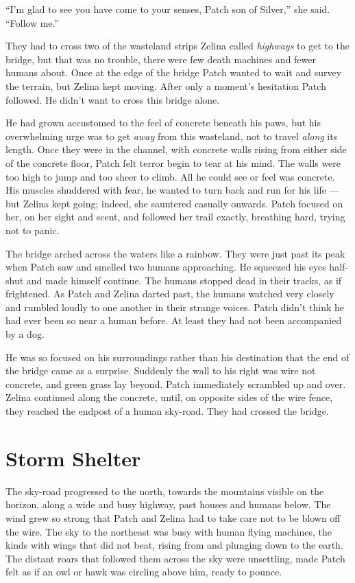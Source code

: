\documentclass[ebook,oneside,openany,17pt]{memoir}
\renewcommand{\thechapter}{\Roman{chapter}}
\newcounter{sections}
\newcommand{\sections}[1]{%
  \section*{#1}
  \addtocounter{sections}{1}%
  \pdfbookmark[1]{#1}{section.\thechapter.\thesections}}
\begin{document}
“I’m glad to see you have come to your senses, Patch son of Silver,”
she said. “Follow me.”

They had to cross two of the wasteland strips Zelina called
\emph{highways} to get to the bridge, but that was no trouble, there
were few death machines and fewer humans about. Once at the edge of
the bridge Patch wanted to wait and survey the terrain, but Zelina
kept moving. After only a moment’s hesitation Patch followed. He
didn’t want to cross this bridge alone.

He had grown accustomed to the feel of concrete beneath his paws, but
his overwhelming urge was to get \emph{away} from this wasteland,
not to travel \emph{along} its length. Once they were in the
channel, with concrete walls rising from either side of the concrete
floor, Patch felt terror begin to tear at his mind. The walls were too
high to jump and too sheer to climb. All he could see or feel was
concrete. His muscles shuddered with fear, he wanted to turn back and
run for his life — but Zelina kept going; indeed, she sauntered
casually onwards. Patch focused on her, on her sight and scent, and
followed her trail exactly, breathing hard, trying not to panic.

The bridge arched across the waters like a rainbow. They were just
past its peak when Patch saw and smelled two humans approaching. He
squeezed his eyes half-shut and made himself continue. The humans
stopped dead in their tracks, as if frightened. As Patch and Zelina
darted past, the humans watched very closely and rumbled loudly to one
another in their strange voices. Patch didn’t think he had ever been
so near a human before. At least they had not been accompanied by a
dog.

He was so focused on his surroundings rather than his destination that
the end of the bridge came as a surprise. Suddenly the wall to his
right was wire not concrete, and green grass lay beyond. Patch
immediately scrambled up and over. Zelina continued along the
concrete, until, on opposite sides of the wire fence, they reached the
endpost of a human sky-road. They had crossed the bridge.


\sections{Storm Shelter}

The sky-road progressed to the north, towards the mountains visible on
the horizon, along a wide and busy highway, past houses and humans
below. The wind grew so strong that Patch and Zelina had to take care
not to be blown off the wire. The sky to the northeast was busy with
human flying machines, the kinds with wings that did not beat, rising
from and plunging down to the earth. The distant roars that followed
them across the sky were unsettling, made Patch felt as if an owl or
hawk was circling above him, ready to pounce.
\end{document}

